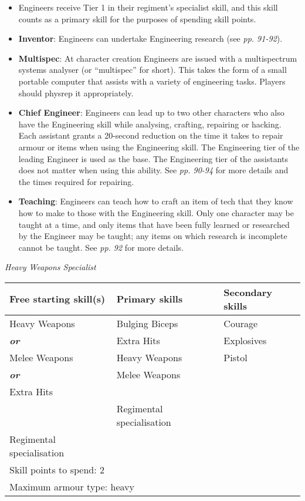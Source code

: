 \begin{itemize}
\item Engineers receive Tier 1 in their regiment's specialist skill, and this skill counts as a primary skill for the purposes of spending skill points.

\item \textbf{Inventor}: Engineers can undertake Engineering research (see \textit{pp. 91-92}).

\item \textbf{Multispec}: At character creation Engineers are issued with a multispectrum systems analyser (or ``multispec'' for short). This takes the form of a small portable computer that assists with a variety of engineering tasks. Players should physrep it appropriately.

\item \textbf{Chief Engineer}: Engineers can lead up to two other characters who also have the Engineering skill while analysing, crafting, repairing or hacking. Each assistant grants a 20-second reduction on the time it takes to repair armour or items when using the Engineering skill. The Engineering tier of the leading Engineer is used as the base. The Engineering tier of the assistants does not matter when using this ability. See \textit{pp. 90-94} for more details and the times required for repairing.

\item \textbf{Teaching}: Engineers can teach how to craft an item of tech that they know how to make to those with the Engineering skill. Only one character may be taught at a time, and only items that have been fully learned or researched by the Engineer may be taught; any items on which research is incomplete cannot be taught. See \textit{pp. 92} for more details.

\end{itemize}
\textit{Heavy Weapons Specialist}

\begin{table}[H]
\begin{tabular}{|l|l|l|} \hline 
Free starting skill(s) & Primary skills & Secondary skills \\
 \hline Heavy Weapons & Bulging Biceps & Courage \\
 \hline \textbf{\textit{or}} & Extra Hits & Explosives \\
 \hline Melee Weapons & Heavy Weapons & Pistol \\
 \hline \textbf{\textit{or}} & Melee Weapons &  \\
 \hline Extra Hits &  &  \\
 \hline  & Regimental specialisation &  \\
 \hline Regimental specialisation &  &  \\
 \hline \multicolumn{3}{|l|}{Skill points to spend: 2} \\
 \hline \multicolumn{3}{|l|}{Maximum armour type: heavy} \\
 \hline \end{tabular}

\end{table}


